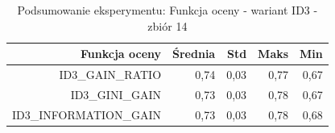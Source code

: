 \begin{table}[htbp]
\centering
\small
\setlength{\tabcolsep}{6pt}
\renewcommand{\arraystretch}{1.2}
\caption{Podsumowanie eksperymentu: Funkcja oceny - wariant ID3 - zbiór 14}
\label{tab:ID3_eval_function_14}
\begin{tabular}{r|r|r|r|r}
\toprule
Funkcja oceny & Średnia & Std & Maks & Min \\
\hline
ID3\_GAIN\_RATIO & 0,74 & 0,03 & 0,77 & 0,67 \\
ID3\_GINI\_GAIN & 0,73 & 0,03 & 0,78 & 0,67 \\
ID3\_INFORMATION\_GAIN & 0,73 & 0,03 & 0,78 & 0,68 \\
\bottomrule
\end{tabular}
\end{table}